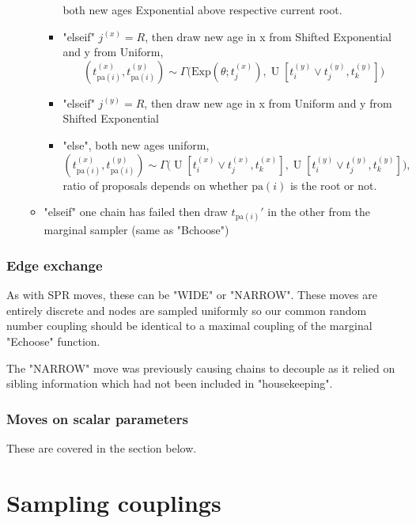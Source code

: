 \documentclass[11pt,a4paper]{article}
\newcommand{\pa}{\mathrm{pa}}
\newcommand{\Exp}[1]{\mathrm{Exp}(#1)}
\DeclareMathOperator*{\Unif}{\mathrm{U}}
\begin{document}
\begin{enumerate}
\begin{itemize}
\begin{itemize}
\[            \]
            both new ages Exponential above respective current root.
            \item "elseif" $ j^{(x)} = R $, then draw new age in x from Shifted Exponential and y from Uniform,
            \[
                (t_{\pa(i)}^{(x)}, t_{\pa(i)}^{(y)}) \sim \Gamma\big(\Exp{\theta; t_j^{(x)}}, \Unif[t_i^{(y)} \vee t_j^{(y)}, t_k^{(y)}]\big)
            \]
            \item "elseif" $ j^{(y)} = R $, then draw new age in x from Uniform and y from Shifted Exponential
            \item "else", both new ages uniform,
            \[
                (t_{\pa(i)}^{(x)}, t_{\pa(i)}^{(y)}) \sim \Gamma\big(\Unif[t_i^{(x)} \vee t_j^{(x)}, t_k^{(x)}], \Unif[t_i^{(y)} \vee t_j^{(y)}, t_k^{(y)}]\big),
            \]
            ratio of proposals depends on whether $ \pa(i) $ is the root or not.
        \end{itemize}
        \item "elseif" one chain has failed then draw $ t_{\pa(i)}' $ in the other from the marginal sampler (same as "Bchoose")
    \end{itemize}
\end{enumerate}

\subsubsection{Edge exchange}

As with SPR moves, these can be "WIDE" or "NARROW". These moves are entirely discrete and nodes are sampled uniformly so our common random number coupling should be identical to a maximal coupling of the marginal "Echoose" function.

The "NARROW" move was previously causing chains to decouple as it relied on sibling information which had not been included in "housekeeping".

\subsubsection{Moves on scalar parameters}

These are covered in the section below.


\section{Sampling couplings}
\end{document}
